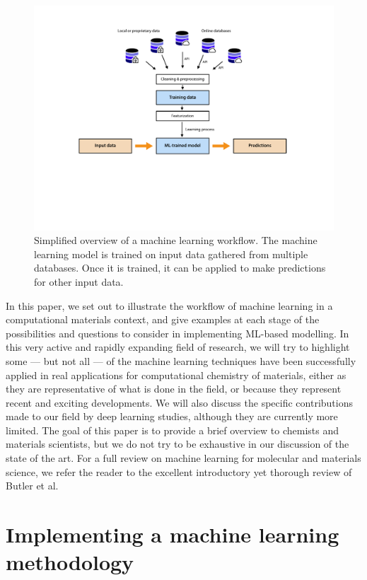 \documentclass[aip,apm,amsmath,amssymb,reprint]{revtex4-2}
\begin{document}
\begin{figure}[t]
\includegraphics[width=13cm]{ML_workflow}
\caption{\label{fig:ML_workflow} Simplified overview of a machine learning workflow. The machine learning model is trained on input data gathered from multiple databases. Once it is trained, it can be applied to make predictions for other input data.}
\end{figure}

In this paper, we set out to illustrate the workflow of machine learning in a computational materials context, and give examples at each stage of the possibilities and questions to consider in implementing ML-based modelling. In this very active and rapidly expanding field of research, we will try to highlight some --- but not all --- of the machine learning techniques have been successfully applied in real applications for computational chemistry of materials, either as they are representative of what is done in the field, or because they represent recent and exciting developments. We will also discuss the specific contributions made to our field by deep learning studies, although they are currently more limited. The goal of this paper is to provide a brief overview to chemists and materials scientists, but we do not try to be exhaustive in our discussion of the state of the art. For a full review on machine learning for molecular and materials science, we refer the reader to the excellent introductory yet thorough review of Butler et al.\cite{Butler2018}


\section{Implementing a machine learning methodology}
\end{document}
